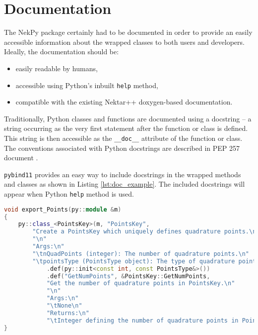 \chapter{Documentation}

The NekPy package certainly had to be documented in order to provide an easily
accessible information about the wrapped classes to both users and
developers. Ideally, the documentation should be:
\begin{itemize}
  \item easily readable by humans,
  \item accessible using Python's inbuilt \texttt{help} method,
  \item compatible with the existing Nektar++ doxygen-based documentation.
\end{itemize}

Traditionally, Python classes and functions are documented using a docstring --
a string occurring as the very first statement after the function or class is
defined. This string is then accessible as the \texttt{\_\_doc\_\_} attribute of
the function or class. The conventions associated with Python docstrings are
described in PEP 257 document \cite{PEP257}.

\texttt{pybind11} provides an easy way to include docstrings in the wrapped methods
and classes as shown in Listing \ref{lst:doc_example}. The included docstrings
will appear when Python \texttt{help} method is used.

\begin{lstlisting}[caption={Example of class and method documentation in pybind11}, label={lst:doc_example}, language=C++]
void export_Points(py::module &m)
{
	py::class_<PointsKey>(m, "PointsKey", 
        "Create a PointsKey which uniquely defines quadrature points.\n"
        "\n"
        "Args:\n"
        "\tnQuadPoints (integer): The number of quadrature points.\n"
        "\tpointsType (PointsType object): The type of quadrature points.")
            .def(py::init<const int, const PointsType&>())
            .def("GetNumPoints", &PointsKey::GetNumPoints,
            "Get the number of quadrature points in PointsKey.\n"
            "\n"
            "Args:\n"
            "\tNone\n"
            "Returns:\n"
            "\tInteger defining the number of quadrature points in PointsKey.")
}
\end{lstlisting}

